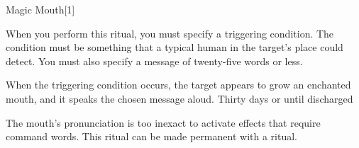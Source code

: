 \begin{spellsection}{Magic Mouth}[1]
    \begin{spellheader}
    \end{spellheader}
    \begin{spellcontent}
        \begin{spelltargetinginfo}
            \spellrng{\rngclose}
        \end{spelltargetinginfo}
        \begin{spelleffects}
            \spellspecial When you perform this ritual, you must specify a triggering condition. The condition must be something that a typical human in the target's place could detect. You must also specify a message of twenty-five words or less.

            \spelleffect When the triggering condition occurs, the target appears to grow an enchanted mouth, and it speaks the chosen message aloud.
            \spelldur Thirty days or until discharged \dismissable
        \end{spelleffects}
    \end{spellcontent}
    \begin{spellfooter}
        \spellnotes The mouth's pronunciation is too inexact to activate effects that require command words. This ritual can be made permanent with a  ritual.
    \end{spellfooter}
    \begin{spellaugments}
    \end{spellaugments}
\end{spellsection}

